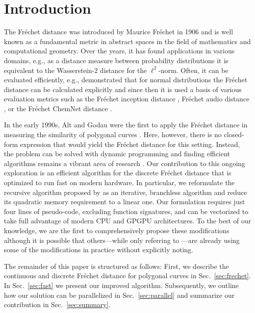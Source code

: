 \section{Introduction}
The Fr\'echet distance was introduced by Maurice Fr\'echet in 1906 \citep{frechet06} and is well known as a fundamental metric in abstract spaces in the field of mathematics and computational geometry.
Over the years, it has found applications in various domains, e.g., as a distance measure between probability distributions it is equivalent to the Wasserstein-2 distance \citep{kantorovich60,wasserstein69} for the $\ell^2$-norm.
Often, it can be evaluated efficiently, e.g., \citet{dowson82} demonstrated that for normal distributions the Fr\'echet distance can be calculated explicitly and since then it is used a basis of various evaluation metrics such as the Fr\'echet inception distance \citep{heusel17}, Fr\'echet audio distance \citep{kilgour19}, or the Fr\'echet ChemNet distance \citep{preuer18}.

In the early 1990s, Alt and Godau were the first to apply the Fr\'echet distance in measuring the similarity of polygonal curves \citep{alt92,alt95}.
Here, however, there is no closed-form expression that would yield the Fr\'echet distance for this setting.
Instead, the problem can be solved with dynamic programming and finding efficient algorithms remains a vibrant area of research \citep{aronov06,avraham14,agarwal14,bringmann19}.
Our contribution to this ongoing exploration is an efficient algorithm for the discrete Fr\'echet distance that is optimized to run fast on modern hardware.
In particular, we reformulate the recursive algorithm proposed by \citet{eiter94} as an iterative, branchless algorithm and reduce its quadratic memory requirement to a linear one.
Our formulation requires just four lines of pseudo-code, excluding function signatures, and can be vectorized to take full advantage of modern CPU and GPGPU architectures.
To the best of our knowledge, we are the first to comprehensively propose these modifications although it is possible that others---while only referring to \citet{eiter94}---are already using some of the modifications in practice without explicitly noting.

The remainder of this paper is structured as follows:
First, we describe the continuous and discrete Fr\'echet distance for polygonal curves in Sec.~\ref{sec:frechet}.
In Sec.~\ref{sec:fast} we present our improved algorithm.
Subsequently, we outline how our solution can be parallelized in Sec.~\ref{sec:parallel} and summarize our contribution in Sec.~\ref{sec:summary}.

